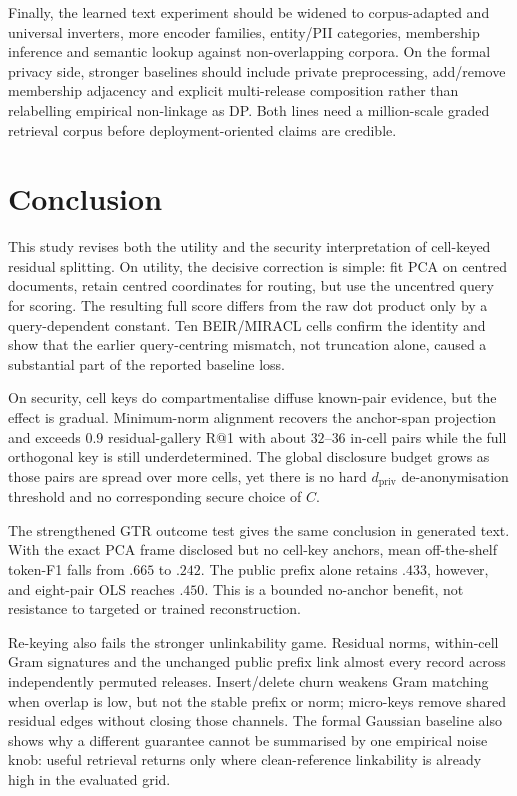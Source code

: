 Finally, the learned text experiment should be widened to corpus-adapted and
universal inverters, more encoder families, entity/PII categories, membership
inference and semantic lookup against non-overlapping corpora. On the formal
privacy side, stronger baselines should include private preprocessing,
add/remove membership adjacency and explicit multi-release composition rather
than relabelling empirical non-linkage as DP. Both lines need a million-scale
graded retrieval corpus before deployment-oriented claims are credible.

\section{Conclusion}\label{sec:conclusion}

This study revises both the utility and the security interpretation of
cell-keyed residual splitting. On utility, the decisive correction is simple:
fit PCA on centred documents, retain centred coordinates for routing, but use
the uncentred query for scoring. The resulting full score differs from the raw
dot product only by a query-dependent constant. Ten BEIR/MIRACL cells confirm
the identity and show that the earlier query-centring mismatch, not truncation
alone, caused a substantial part of the reported baseline loss.

On security, cell keys do compartmentalise diffuse known-pair evidence, but
the effect is gradual. Minimum-norm alignment recovers the anchor-span
projection and exceeds $0.9$ residual-gallery R@1 with about $32$--$36$
in-cell pairs while the full orthogonal key is still underdetermined. The
global disclosure budget grows as those pairs are spread over more cells,
yet there is no hard $d_{\mathrm{priv}}$ de-anonymisation threshold and no
corresponding secure choice of $C$.

The strengthened GTR outcome test gives the same conclusion in generated
text. With the exact PCA frame disclosed but no cell-key anchors, mean
off-the-shelf token-F1 falls from $.665$ to $.242$. The public prefix alone
retains $.433$, however, and eight-pair OLS reaches $.450$. This is a bounded
no-anchor benefit, not resistance to targeted or trained reconstruction.

Re-keying also fails the stronger unlinkability game. Residual norms,
within-cell Gram signatures and the unchanged public prefix link almost every
record across independently permuted releases. Insert/delete churn weakens
Gram matching when overlap is low, but not the stable prefix or norm;
micro-keys remove shared residual edges without closing those channels. The
formal Gaussian baseline also shows why a different guarantee cannot be
summarised by one empirical noise knob: useful retrieval returns only where
clean-reference linkability is already high in the evaluated grid.

